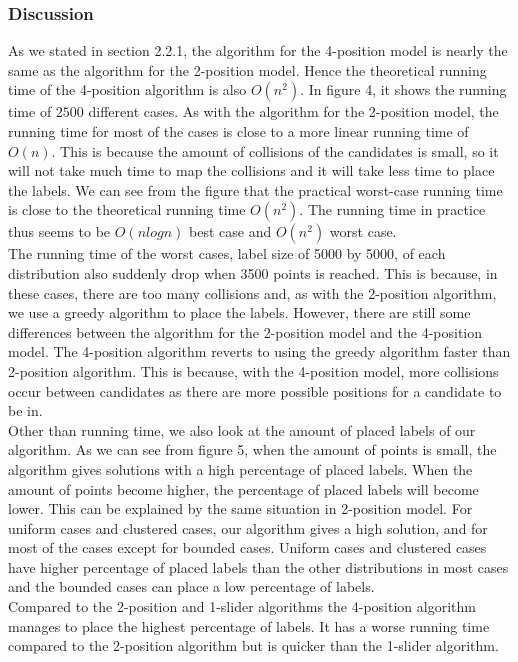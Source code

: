 \documentclass[crop=false,a4paper,oneside,11pt]{standalone}
\begin{document}
\subsubsection{Discussion}
As we stated in section 2.2.1, the algorithm for the 4-position model is nearly the same as the algorithm for the 2-position model. Hence the theoretical running time of the 4-position algorithm is also $O(n^2)$. In figure 4, it shows the running time of $2500$ different cases. As with the algorithm for the 2-position model, the running time for most of the cases is close to a more linear running time of $O(n)$. This is because the amount of collisions of the candidates is small, so it will not take much time to map the collisions and it will take less time to place the labels. We can see from the figure that the practical worst-case running time is close to the theoretical running time $O(n^2)$. The running time in practice thus seems to be $O(nlogn)$ best case and $O(n^2)$ worst case.\\
The running time of the worst cases, label size of 5000 by 5000, of each distribution also suddenly drop when 3500 points is reached. This is because, in these cases, there are too many collisions and, as with the 2-position algorithm, we use a greedy algorithm to place the labels. However, there are still some differences between the algorithm for the 2-position model and the 4-position model. The 4-position algorithm reverts to using the greedy algorithm faster than 2-position algorithm. This is because, with the 4-position model, more collisions occur between candidates as there are more possible positions for a candidate to be in.\\
Other than running time, we also look at the amount of placed labels of our algorithm. As we can see from figure 5, when the amount of points is small, the algorithm gives solutions with a high percentage of placed labels. When the amount of points become higher, the percentage of placed labels will become lower. This can be explained by the same situation in 2-position model. For uniform cases and clustered cases, our algorithm gives a high solution, and for most of the cases except for bounded cases. Uniform cases and clustered cases have higher percentage of placed labels than the other distributions in most cases and the bounded cases can place a low percentage of labels.\\
Compared to the 2-position and 1-slider algorithms the 4-position algorithm manages to place the highest percentage of labels. It has a worse running time compared to the 2-position algorithm but is quicker than the 1-slider algorithm.\\
\end{document}
